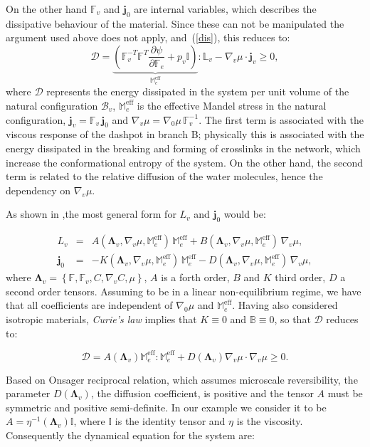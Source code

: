 \documentclass[12pt]{extarticle}
\newcommand{\F}{\ensuremath{\mathbb{F}}}
\newcommand{\B}{\ensuremath{\mathbb{B}}}
\newcommand{\LL}{\ensuremath{\mathbb{L}}}
\newcommand{\Me}{\ensuremath{\mathbb{M}_e^{\text{eff}}}}
\begin{document}
On the other hand $\F_v$ and $\mathbf{j}_0$ are internal variables, which describes the dissipative behaviour of the material. Since these can not be manipulated the argument used above does not apply, and~(\ref{dis}), this reduces to:
\begin{equation}
\mathcal{D}=\underbrace{\left(\F_v^{-T}\F^{T} \frac{\partial \psi}{\partial \F_e}+p_v \mathbb{I}\right)}_{\Me}:\LL_v - \nabla_v \mu \cdot \mathbf{j}_v \geq 0,
\end{equation}
where $\mathcal{D}$ represents the energy dissipated in the system per unit volume of the natural configuration $\mathcal{B}_v$, $\Me$ is the effective Mandel stress in the natural configuration, $\mathbf{j}_v = \F_v \,\mathbf{j}_0$ and $\nabla_v \mu= \nabla_0 \mu\, \F_v^{-1}$.
The first term is associated with the viscous response of the dashpot in branch B; physically this is associated with the energy dissipated in the breaking and forming of crosslinks in the network, which increase the conformational entropy of the system. On the other hand, the second term is related to the relative diffusion of the water molecules, hence the dependency on $\nabla_v \mu$. 

As shown in \cite{Article2},the most general form for $L_v$ and $\mathbf{j}_0$ would be:

\begin{eqnarray}
L_v &=& A(\boldsymbol{\Lambda}_v, \nabla_v \mu, \Me)\, \Me + B(\boldsymbol{\Lambda}_v,\nabla_v \mu, \Me)\, \nabla_v \mu,\\
\mathbf{j}_0 &=& -K(\boldsymbol{\Lambda}_v, \nabla_v \mu, \Me) \, \Me - D(\boldsymbol{\Lambda}_v, \nabla_v \mu, \Me) \, \nabla_v \mu,
\end{eqnarray}
where $\boldsymbol{\Lambda}_v=\left\{\F,\F_v,C,\nabla_v C, \mu\right\}$, $A$ is a forth order, $B$ and $K$ third order, $D$ a second order tensors. Assuming to be in a linear non-equilibrium regime, we have that all coefficients are independent of $\nabla_0 \mu$ and $\Me$. Having also considered isotropic materials, \textit{Curie's law} implies that $K\equiv0$ and $\B\equiv 0$, so that $\mathcal{D}$ reduces to:

\begin{equation*}
\mathcal{D}= A(\boldsymbol{\Lambda}_v) \Me : \Me  + D(\boldsymbol{\Lambda}_v)\nabla_v \mu\cdot\nabla_v \mu\geq 0 .
\end{equation*}

Based on Onsager reciprocal relation, which assumes microscale reversibility, the parameter $D(\boldsymbol{\Lambda}_v)$, the diffusion coefficient, is positive and the tensor $A$ must be symmetric and positive semi-definite. In our example we consider it to be $A=\eta^{-1}(\boldsymbol{\Lambda}_v) \mathbb{I}$, where $\mathbb{I}$ is the identity tensor and $\eta$ is the viscosity. Consequently the dynamical equation for the system are:
\end{document}
